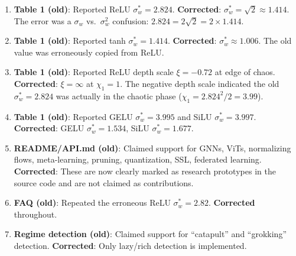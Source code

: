 \documentclass[10pt]{article}
\theoremstyle{definition}
\begin{document}
\begin{enumerate}[nosep]
  \item \textbf{Table 1 (old)}: Reported ReLU $\sigma_w^* = 2.824$. \textbf{Corrected}: $\sigma_w^* = \sqrt{2} \approx 1.414$. The error was a $\sigma_w$ vs.\ $\sigma_w^2$ confusion: $2.824 = 2\sqrt{2} = 2 \times 1.414$.
  \item \textbf{Table 1 (old)}: Reported tanh $\sigma_w^* = 1.414$. \textbf{Corrected}: $\sigma_w^* \approx 1.006$. The old value was erroneously copied from ReLU.
  \item \textbf{Table 1 (old)}: Reported ReLU depth scale $\xi = -0.72$ at edge of chaos. \textbf{Corrected}: $\xi = \infty$ at $\chi_1 = 1$. The negative depth scale indicated the old $\sigma_w^* = 2.824$ was actually in the chaotic phase ($\chi_1 = 2.824^2/2 = 3.99$).
  \item \textbf{Table 1 (old)}: Reported GELU $\sigma_w^* = 3.995$ and SiLU $\sigma_w^* = 3.997$. \textbf{Corrected}: GELU $\sigma_w^* = 1.534$, SiLU $\sigma_w^* = 1.677$.
  \item \textbf{README/API.md (old)}: Claimed support for GNNs, ViTs, normalizing flows, meta-learning, pruning, quantization, SSL, federated learning. \textbf{Corrected}: These are now clearly marked as research prototypes in the source code and are not claimed as contributions.
  \item \textbf{FAQ (old)}: Repeated the erroneous ReLU $\sigma_w^* = 2.82$. \textbf{Corrected} throughout.
  \item \textbf{Regime detection (old)}: Claimed support for ``catapult'' and ``grokking'' detection. \textbf{Corrected}: Only lazy/rich detection is implemented.
\end{enumerate}
\end{document}
